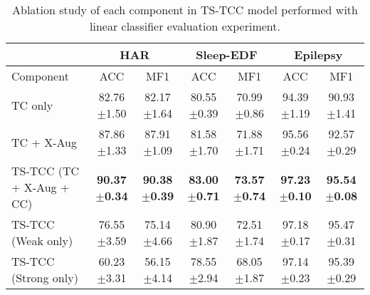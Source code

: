 \documentclass{article}
\begin{document}
\begin{table*}[!h]
\centering
\caption{Cross-domains transfer learning experiment applied on Fault Diagnosis dataset in terms of accuracy. (FT stands for fine-tuning)}
\label{tbl:TL}
\end{table*}
 
\begin{table*}[!htb]
\centering

\begin{tabular}{@{}l|cc|cc|cc@{}}
\toprule
 & \multicolumn{2}{c|}{HAR} & \multicolumn{2}{c|}{Sleep-EDF} & \multicolumn{2}{c}{Epilepsy} \\ \midrule
Component & ACC & MF1 & ACC & MF1 & ACC & MF1 \\ \midrule

TC only  & 82.76$\pm$1.50 & 82.17$\pm$1.64 & 80.55$\pm$0.39 & 70.99$\pm$0.86 & 94.39$\pm$1.19 & 90.93$\pm$1.41 \\

TC + X-Aug & 87.86$\pm$1.33 & 87.91$\pm$1.09 & 81.58$\pm$1.70 & 71.88$\pm$1.71 & 95.56$\pm$0.24 & 92.57$\pm$0.29 \\ 

TS-TCC (TC + X-Aug + CC)  & \textbf{90.37$\pm$0.34} & \textbf{90.38$\pm$0.39} & \textbf{83.00$\pm$0.71} & \textbf{73.57$\pm$0.74} & \textbf{97.23$\pm$0.10} & \textbf{95.54$\pm$0.08} \\

\midrule

TS-TCC (Weak only)   & 76.55$\pm$3.59 & 75.14$\pm$4.66 & 80.90$\pm$1.87 & 72.51$\pm$1.74 & 97.18$\pm$0.17 & 95.47$\pm$0.31 \\ 

TS-TCC (Strong only)  & 60.23$\pm$3.31 & 56.15$\pm$4.14 & 78.55$\pm$2.94 & 68.05$\pm$1.87 & 97.14$\pm$0.23 & 95.39$\pm$0.29 \\ 


\bottomrule
\end{tabular}
\caption{Ablation study of each component in TS-TCC model performed with linear classifier evaluation experiment.}
\label{tbl:ablation}
\end{table*}
\end{document}
